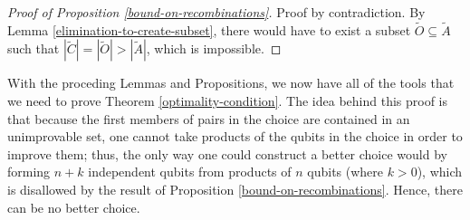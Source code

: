 \documentclass[twocolumn,showpacs,preprintnumbers,amsmath,amssymb,nofootinbib,pra,floatfix]{revtex4-1}
\newenvironment{remark}[1][Remark]{\begin{trivlist}
\item[\hskip \labelsep {\bfseries #1}]}{\end{trivlist}}
\newcommand{\set}{\tilde}
\begin{document}
\begin{proof}[Proof of Proposition \ref{bound-on-recombinations}]
Proof by contradiction.  By Lemma \ref{elimination-to-create-subset}, there would have to exist a subset $\set O\subseteq\set A$ such that $|\set C|=|\set O|>|\set A|$, which is impossible.
\end{proof}
\begin{remark}
With the proceding Lemmas and Propositions, we now have all of the tools that we need to prove Theorem \ref{optimality-condition}.  The idea behind this proof is that because the first members of pairs in the choice are contained in an unimprovable set, one cannot take products of the qubits in the choice in order to improve them;  thus, the only way one could construct a better choice would by forming $n+k$ independent qubits from products of $n$ qubits (where $k>0$), which is disallowed by the result of Proposition \ref{bound-on-recombinations}.  Hence, there can be no better choice.
\end{remark}
\end{document}
